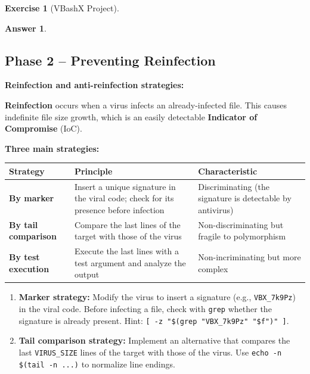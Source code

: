 \documentclass[a4paper,11pt]{article}
\theoremstyle{plain}
\newtheorem{correction}{Answer}
\theoremstyle{definition}
\newtheorem{exercice}{Exercise}
\begin{document}
\begin{exercice}[VBashX Project]
\begin{correction}
\end{correction}



\subsection*{Phase 2 -- Preventing Reinfection}

\begin{rappel}
\textbf{Reinfection and anti-reinfection strategies:}

\textbf{Reinfection} occurs when a virus infects an already-infected file. This causes indefinite file size growth, which is an easily detectable \textbf{Indicator of Compromise} (IoC).

\medskip
\textbf{Three main strategies:}

\begin{center}
\begin{tabular}{lp{5cm}p{4cm}}
\toprule
\textbf{Strategy} & \textbf{Principle} & \textbf{Characteristic} \\
\midrule
\textbf{By marker} & Insert a unique signature in the viral code; check for its presence before infection & Discriminating (the signature is detectable by antivirus) \\
\textbf{By tail comparison} & Compare the last lines of the target with those of the virus & Non-discriminating but fragile to polymorphism \\
\textbf{By test execution} & Execute the last lines with a test argument and analyze the output & Non-incriminating but more complex \\
\bottomrule
\end{tabular}
\end{center}
\end{rappel}

\begin{enumerate}
\item[\textbf{2a)}] \textbf{Marker strategy:} Modify the virus to insert a signature (e.g., \texttt{VBX\_7k9Pz}) in the viral code. Before infecting a file, check with \texttt{grep} whether the signature is already present. Hint: \texttt{[ -z "\$(grep "VBX\_7k9Pz" "\$f")" ]}.

\item[\textbf{2b)}] \textbf{Tail comparison strategy:} Implement an alternative that compares the last \texttt{VIRUS\_SIZE} lines of the target with those of the virus. Use \texttt{echo -n \$(tail -n ...)} to normalize line endings.


\end{enumerate}
\end{exercice}
\end{document}
